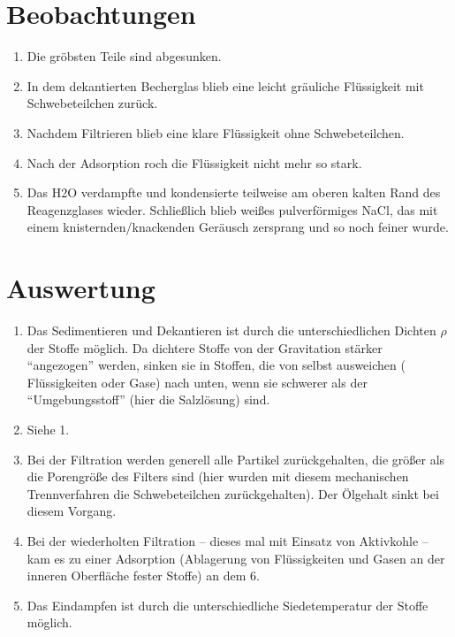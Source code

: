 \documentclass[
  ngerman,
]{scrartcl}
\begin{document}
\section*{Beobachtungen}
\begin{enumerate}
  \item Die gröbsten Teile sind abgesunken.
  \item In dem dekantierten Becherglas blieb eine leicht gräuliche Flüssigkeit mit Schwebeteilchen zurück.
  \item Nachdem Filtrieren blieb eine klare Flüssigkeit ohne Schwebeteilchen.
  \item Nach der Adsorption roch die Flüssigkeit nicht mehr so stark.
  \item Das \ac{H2O} verdampfte und kondensierte teilweise am oberen kalten Rand des Reagenzglases wieder.
    Schließlich blieb weißes pulverförmiges \ac{NaCl}, das mit einem knisternden/knackenden Geräusch zersprang und so noch
feiner wurde.
\end{enumerate}

\section*{Auswertung}
\begin{enumerate}
  \item Das Sedimentieren und Dekantieren ist durch die unterschiedlichen Dichten $\rho $ der Stoffe möglich. Da
    dichtere Stoffe von der Gravitation stärker \enquote{angezogen} werden, sinken sie in Stoffen, die von selbst ausweichen
    (\zB{} Flüssigkeiten oder Gase) nach unten, wenn sie schwerer als der \enquote{Umgebungsstoff} (hier die Salzlösung) sind.
  \item Siehe 1.
  \item Bei der Filtration werden generell alle Partikel zurückgehalten,
    die größer als die Porengröße des Filters sind
    (hier wurden mit diesem mechanischen Trennverfahren die Schwebeteilchen zurückgehalten).
    Der Ölgehalt sinkt bei diesem Vorgang.
  \item Bei der wiederholten Filtration – dieses mal mit Einsatz von Aktivkohle – kam es zu einer Adsorption
    (Ablagerung von Flüssigkeiten und Gasen an der inneren Oberfläche fester Stoffe) an dem \ac*{6}.
  \item Das Eindampfen ist durch die unterschiedliche Siedetemperatur der Stoffe möglich.
\end{enumerate}

\appendix

\vfill
\printURLlong%
\doclicenseThis%
\printendsignature%
\end{document}
